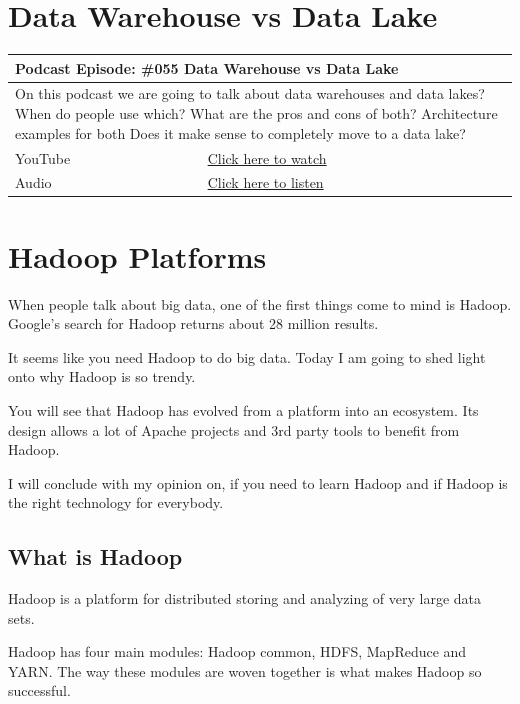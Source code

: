 \documentclass[12pt, numbers=noenddot]{scrreprt} %
\begin{document}
\chapter{Data Warehouse vs Data Lake}

\begin{table}[h]
\begin{tabular}{ll}
\hline
\multicolumn{2}{l}{\textbf{Podcast Episode:} \#055 Data Warehouse vs Data Lake} \\ \hline
\multicolumn{2}{p{15cm}}{On this podcast we are going to talk about data warehouses and data lakes?
When do people use which?
What are the pros and cons of both?
Architecture examples for both
Does it make sense to completely move to a data lake?}         \\ \hline
\multicolumn{1}{l|}{YouTube}   & \href{https://youtu.be/8gNQTrUUwMk}{Click here to watch}   \\
\multicolumn{1}{l|}{Audio}     & \href{https://anchor.fm/andreaskayy/episodes/055-Data-Warehouse-vs-Data-Lake-e45iem}{Click here to listen}   \\ \hline
\end{tabular}
\end{table}

\chapter{Hadoop Platforms}
When people talk about big data, one of the first things come to mind is Hadoop. Google’s search for Hadoop returns about 28 million results.

It seems like you need Hadoop to do big data. Today I am going to shed light onto why Hadoop is so trendy.

You will see that Hadoop has evolved from a platform into an ecosystem. Its design allows a lot of Apache projects and 3rd party tools to benefit from Hadoop.

I will conclude with my opinion on, if you need to learn Hadoop and if Hadoop is the right technology for everybody.

\section{What is Hadoop}

Hadoop is a platform for distributed storing and analyzing of very large data sets.

Hadoop has four main modules: Hadoop common, HDFS, MapReduce and YARN. The way these modules are woven together is what makes Hadoop so successful.
\end{document}
